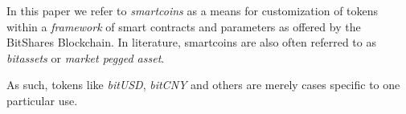 In this paper we refer to \emph{smartcoins} as a means for customization of
tokens within a \emph{framework} of smart contracts and parameters as offered
by the BitShares Blockchain. In literature, smartcoins are also often referred
to as \emph{bitassets} or \emph{market pegged asset}.

As such, tokens like \emph{bitUSD}, \emph{bitCNY} and others are merely cases
specific to one particular use.
